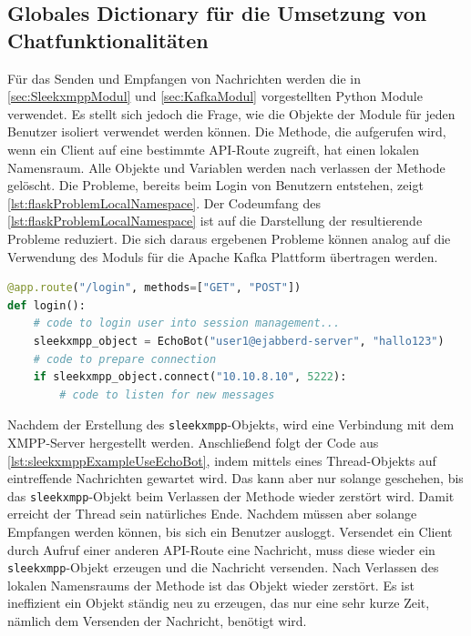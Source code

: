 \documentclass[a4paper,titlepage,halfparskip,12pt]{scrreprt}
\begin{document}
\begin{onehalfspacing}
\section{Globales Dictionary für die Umsetzung von Chatfunktionalitäten}

Für das Senden und Empfangen von Nachrichten werden die in \autoref{sec:SleekxmppModul} und \autoref{sec:KafkaModul} vorgestellten Python Module verwendet. Es stellt sich jedoch die Frage, wie die Objekte der Module für jeden Benutzer isoliert verwendet werden können. Die Methode, die aufgerufen wird, wenn ein Client auf eine bestimmte \acs{API}-Route zugreift, hat einen lokalen Namensraum. Alle Objekte und Variablen werden nach verlassen der Methode gelöscht. Die Probleme, bereits beim Login von Benutzern entstehen, zeigt \autoref{lst:flaskProblemLocalNamespace}. Der Codeumfang des \autoref{lst:flaskProblemLocalNamespace} ist auf die Darstellung der resultierende Probleme reduziert. Die sich daraus ergebenen Probleme können analog auf die Verwendung des Moduls für die Apache Kafka Plattform übertragen werden.

\begin{lstlisting}[language=python, caption={Problem für Chatfunktionalitäten aufgrund des lokalen Namensraums von Methoden}, label={lst:flaskProblemLocalNamespace}]
@app.route("/login", methods=["GET", "POST"])
def login():
	# code to login user into session management...
	sleekxmpp_object = EchoBot("user1@ejabberd-server", "hallo123")
	# code to prepare connection
	if sleekxmpp_object.connect("10.10.8.10", 5222):
		# code to listen for new messages
\end{lstlisting}

Nachdem der Erstellung des \texttt{sleekxmpp}-Objekts, wird eine Verbindung mit dem \acs{XMPP}-Server hergestellt werden. Anschließend folgt der Code aus \autoref{lst:sleekxmppExampleUseEchoBot}, indem mittels eines Thread-Objekts auf eintreffende Nachrichten gewartet wird. Das kann aber nur solange geschehen, bis das \texttt{sleekxmpp}-Objekt beim Verlassen der Methode wieder zerstört wird. Damit erreicht der Thread sein natürliches Ende. Nachdem müssen aber solange Empfangen werden können, bis sich ein Benutzer ausloggt. Versendet ein Client durch Aufruf einer anderen \acs{API}-Route eine Nachricht, muss diese wieder ein \texttt{sleekxmpp}-Objekt erzeugen und die Nachricht versenden. Nach Verlassen des lokalen Namensraums der Methode ist das Objekt wieder zerstört. Es ist ineffizient ein Objekt ständig neu zu erzeugen, das nur eine sehr kurze Zeit, nämlich dem Versenden der Nachricht, benötigt wird.


\end{onehalfspacing}
\end{document}

